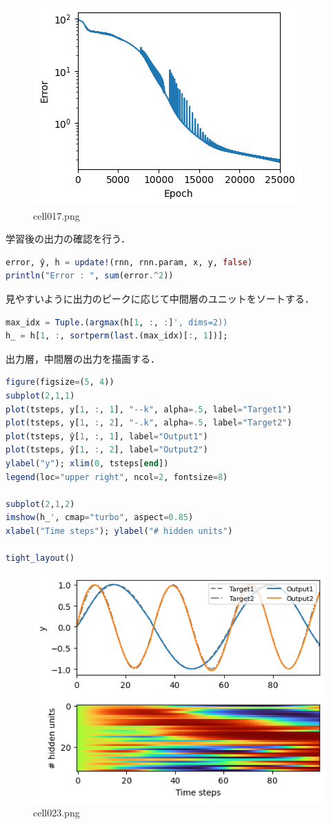 \begin{figure}[ht]
	\centering
	\includegraphics[scale=0.8, max width=\linewidth]{./fig/solve-credit-assignment-problem/bptt/cell017.png}
	\caption{cell017.png}
	\label{cell017.png}
\end{figure}
学習後の出力の確認を行う．
\begin{lstlisting}[language=julia]
error, ŷ, h = update!(rnn, rnn.param, x, y, false)
println("Error : ", sum(error.^2))
\end{lstlisting}
見やすいように出力のピークに応じて中間層のユニットをソートする．
\begin{lstlisting}[language=julia]
max_idx = Tuple.(argmax(h[1, :, :]', dims=2))
h_ = h[1, :, sortperm(last.(max_idx)[:, 1])];
\end{lstlisting}
出力層，中間層の出力を描画する．
\begin{lstlisting}[language=julia]
figure(figsize=(5, 4))
subplot(2,1,1)
plot(tsteps, y[1, :, 1], "--k", alpha=.5, label="Target1")
plot(tsteps, y[1, :, 2], "-.k", alpha=.5, label="Target2")
plot(tsteps, ŷ[1, :, 1], label="Output1")
plot(tsteps, ŷ[1, :, 2], label="Output2")
ylabel("y"); xlim(0, tsteps[end])
legend(loc="upper right", ncol=2, fontsize=8)

subplot(2,1,2)
imshow(h_', cmap="turbo", aspect=0.85)
xlabel("Time steps"); ylabel("# hidden units")

tight_layout()
\end{lstlisting}
\begin{figure}[ht]
	\centering
	\includegraphics[scale=0.8, max width=\linewidth]{./fig/solve-credit-assignment-problem/bptt/cell023.png}
	\caption{cell023.png}
	\label{cell023.png}
\end{figure}
